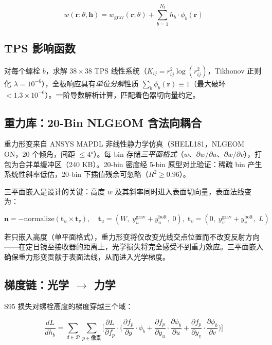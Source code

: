 \documentclass[12pt,a4paper]{ctexart}
\begin{document}
\begin{equation}
w(\mathbf{r}; \theta, \mathbf{h}) = w_{\text{grav}}(\mathbf{r}; \theta) + \sum_{b=1}^{N_b} h_b \cdot \phi_b(\mathbf{r})
\label{eq:surface}
\end{equation}

\subsection{TPS 影响函数}

对每个螺栓 $b$，求解 $38\times38$ TPS 线性系统（$K_{ij} = r_{ij}^2 \log(r_{ij}^2)$，Tikhonov 正则化 $\lambda = 10^{-6}$），全板响应具有\emph{单位分解}性质 $\sum_b \phi_b(\mathbf{r}) \equiv 1$（最大破坏 $< 1.3\times 10^{-6}$）。一阶导数解析计算，匹配着色器切向量约定。

\subsection{重力库：20-Bin NLGEOM 含法向耦合}

重力形变来自 ANSYS MAPDL 非线性静力学仿真（SHELL181，NLGEOM ON，20 个倾角，间距 $\le 4\si{\degree}$）。每 bin 存储\emph{三平面格式}（$w$、$\partial w/\partial u$、$\partial w/\partial v$），打包为合并单缓冲区（240 KB）。20-bin 密度经 5-bin 原型对比验证：稀疏 bin 产生系统性斜率低估，20-bin 下插值残余可忽略（$R^2 \ge 0.96$）。

三平面嵌入是设计的关键：高度 $w$ 及其斜率同时进入表面切向量，表面法线变为：

\begin{equation}
\mathbf{n} = -\text{normalize}(\mathbf{t}_u \times \mathbf{t}_v),\quad
\mathbf{t}_u = (W,\; y_u^{\text{grav}} + y_u^{\text{bolt}},\; 0),\;
\mathbf{t}_v = (0,\; y_v^{\text{grav}} + y_v^{\text{bolt}},\; L)
\label{eq:normal}
\end{equation}

若只嵌入高度（单平面格式），重力形变将仅改变光线交点位置而不改变反射方向——在定日镜至接收器的距离上，光学损失将完全感受不到重力效应。三平面嵌入确保重力形变贡献于表面法线，从而进入光学梯度。

\subsection{梯度链：光学 $\to$ 力学}

S95 损失对螺栓高度的梯度穿越三个域：

\begin{equation}
\frac{dL}{dh_b} = \sum_{d\in\mathcal{D}}\sum_{p\in\text{像素}}
\Bigg[
\frac{\partial L}{\partial f_p} \cdot \Bigg(
\frac{\partial f_p}{\partial y} \cdot \phi_b
+ \frac{\partial f_p}{\partial y_u} \cdot \frac{\partial \phi_b}{\partial u}
+ \frac{\partial f_p}{\partial y_v} \cdot \frac{\partial \phi_b}{\partial v}
\Bigg)
\Bigg]
\label{eq:gradient}
\end{equation}
\end{document}
